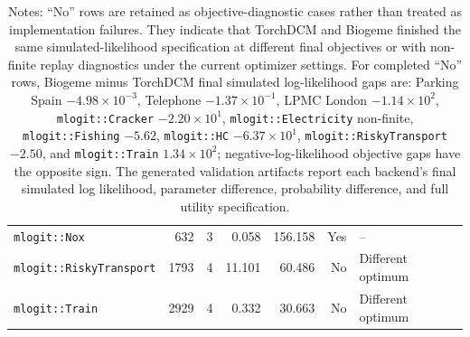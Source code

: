 {\begin{table}[H]
\begin{tabular}{lrrrrrl}
\texttt{mlogit::Nox} & 632 & 3 & 0.058 & 156.158 & Yes & -- \\
\texttt{mlogit::RiskyTransport} & 1793 & 4 & 11.101 & 60.486 & No & Different optimum \\
\texttt{mlogit::Train} & 2929 & 4 & 0.332 & 30.663 & No & Different optimum \\
\bottomrule
\end{tabular}
\caption*{\footnotesize Notes: ``No'' rows are retained as objective-diagnostic cases rather than treated as implementation failures. They indicate that TorchDCM and Biogeme finished the same simulated-likelihood specification at different final objectives or with non-finite replay diagnostics under the current optimizer settings. For completed ``No'' rows, Biogeme minus TorchDCM final simulated log-likelihood gaps are: Parking Spain $-4.98{\times}10^{-3}$, Telephone $-1.37{\times}10^{-1}$, LPMC London $-1.14{\times}10^{2}$, \texttt{mlogit::Cracker} $-2.20{\times}10^{1}$, \texttt{mlogit::Electricity} non-finite, \texttt{mlogit::Fishing} $-5.62$, \texttt{mlogit::HC} $-6.37{\times}10^{1}$, \texttt{mlogit::RiskyTransport} $-2.50$, and \texttt{mlogit::Train} $1.34{\times}10^{2}$; negative-log-likelihood objective gaps have the opposite sign. The generated validation artifacts report each backend's final simulated log likelihood, parameter difference, probability difference, and full utility specification.}
\end{table}
}
